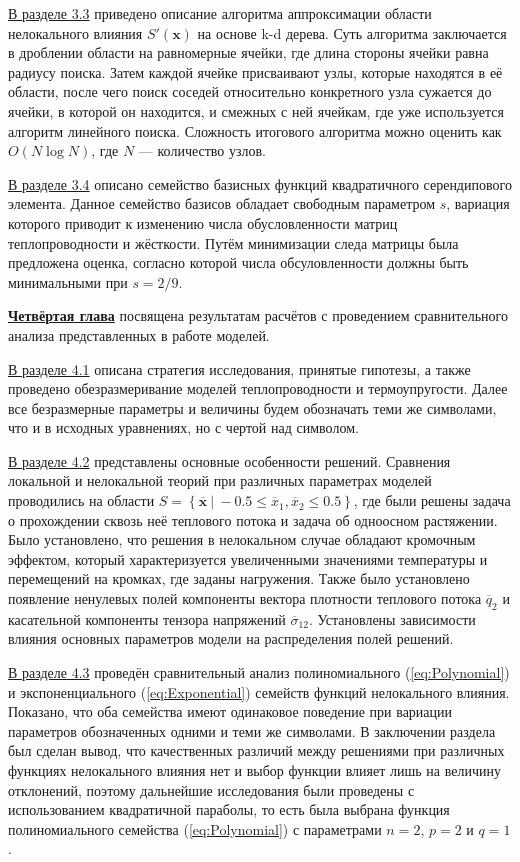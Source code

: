 \underline{В разделе 3.3} приведено описание алгоритма аппроксимации области нелокального влияния $S'(\boldsymbol{x})$ на основе k-d дерева. Суть алгоритма заключается в дроблении области на равномерные ячейки, где длина стороны ячейки равна радиусу поиска. Затем каждой ячейке присваивают узлы, которые находятся в её области, после чего поиск соседей относительно конкретного узла сужается до ячейки, в которой он находится, и смежных с ней ячейкам, где уже используется алгоритм линейного поиска. Сложность итогового алгоритма можно оценить как $O(N \log N)$, где $N$ --- количество узлов.

\underline{В разделе 3.4} описано семейство базисных функций квадратичного серендипового элемента. Данное семейство базисов обладает свободным параметром $s$, вариация которого приводит к изменению числа обусловленности матриц теплопроводности и жёсткости. Путём минимизации следа матрицы была предложена оценка, согласно которой числа обсуловленности должны быть минимальными при $s = 2/9$.

\underline{\textbf{Четвёртая глава}} посвящена результатам расчётов с проведением сравнительного анализа представленных в работе моделей.

\underline{В разделе 4.1} описана стратегия исследования, принятые гипотезы, а также проведено обезразмеривание моделей теплопроводности и термоупругости. Далее все безразмерные параметры и величины будем обозначать теми же символами, что и в исходных уравнениях, но с чертой над символом.

\underline{В разделе 4.2} представлены основные особенности решений. Сравнения локальной и нелокальной теорий при различных параметрах моделей проводились на области $S = \left\{ \overline{\boldsymbol{x}} \ | \ -0.5 \leqslant \overline{x}_1, \overline{x}_2 \leqslant 0.5 \right\}$, где были решены задача о прохождении сквозь неё теплового потока и задача об одноосном растяжении. Было установлено, что решения в нелокальном случае обладают кромочным эффектом, который характеризуется увеличенными значениями температуры и перемещений на кромках, где заданы нагружения. Также было установлено появление ненулевых полей компоненты вектора плотности теплового потока $\overline{q}_2$ и касательной компоненты тензора напряжений $\overline{\sigma}_{12}$. Установлены зависимости влияния основных параметров модели на распределения полей решений.

\underline{В разделе 4.3} проведён сравнительный анализ полиномиального (\ref{eq:Polynomial}) и экспоненциального (\ref{eq:Exponential}) семейств функций нелокального влияния. Показано, что оба семейства имеют одинаковое поведение при вариации параметров обозначенных одними и теми же символами. В заключении раздела был сделан вывод, что качественных различий между решениями при различных функциях нелокального влияния нет и выбор функции влияет лишь на величину отклонений, поэтому дальнейшие исследования были проведены с использованием квадратичной параболы, то есть была выбрана функция полиномиального семейства (\ref{eq:Polynomial}) с параметрами $n = 2$, $p = 2$ и $q = 1$.

